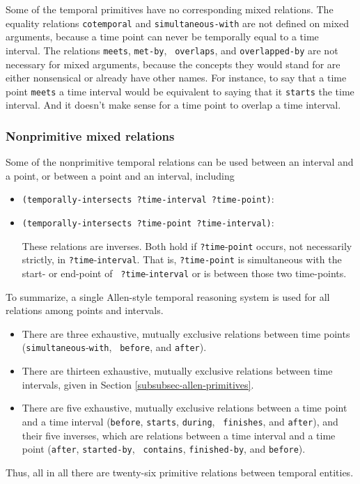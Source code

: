Some of the temporal primitives have no corresponding mixed relations.  The
equality relations {\tt cotemporal} and {\tt simultaneous-with} are not
defined on mixed arguments, because a time point can never be temporally
equal to a time interval.  The relations {\tt meets}, {\tt met-by}, {\tt
overlaps}, and {\tt overlapped-by} are not necessary for mixed arguments,
because the concepts they would stand for are either nonsensical or already
have other names.  For instance, to say that a time point {\tt meets} a time
interval would be equivalent to saying that it {\tt starts} the time
interval.  And it doesn't make sense for a time point to overlap a time
interval.

\subsubsection{Nonprimitive mixed relations}

Some of the nonprimitive temporal relations can be used between an interval
and a point, or between a point and an interval, including

\begin{itemize}

  \item{\verb'(temporally-intersects ?time-interval ?time-point)':}

 \item{\verb'(temporally-intersects ?time-point ?time-interval)':}

  These relations are inverses.  Both hold if {\tt ?time}-{\tt point}
  occurs, not necessarily strictly, in {\tt ?time}-{\tt interval}.  That is,
  {\tt ?time-point} is simultaneous with the start- or end-point of {\tt
  ?time}-{\tt interval} or is between those two time-points.
\end{itemize}

To summarize, a single Allen-style temporal reasoning system is used for all
relations among points and intervals.
\begin{itemize}
 \item There are three exhaustive, mutually
exclusive relations between time points ({\tt simultaneous}-{\tt with}, {\tt
before}, and {\tt after}).

 \item There are thirteen exhaustive, mutually exclusive relations between time
intervals, given in Section \ref{subsubsec-allen-primitives}.

 \item There are five exhaustive, mutually exclusive relations between a time
point and a time interval ({\tt before}, {\tt starts}, {\tt during}, {\tt
finishes}, and {\tt after}), and their five inverses, which are relations
between a time interval and a time point ({\tt after}, {\tt started-by}, {\tt
contains}, {\tt finished-by}, and {\tt before}).
\end{itemize}
Thus, all in all there are twenty-six primitive relations between temporal
entities.
